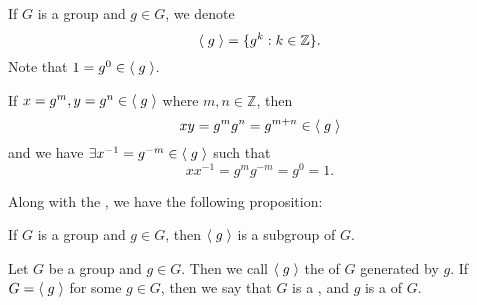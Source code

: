 \begin{notation}
  If $G$ is a group and $g \in G$, we denote
  \begin{equation*}
    \langle \; g \; \rangle = \{ g^k : k \in \mathbb{Z} \}.
  \end{equation*}
  Note that $1 = g^0 \in \langle \; g \; \rangle$.

  If $x = g^m, y = g^n \in \langle \; g \; \rangle$ where $m, n \in \mathbb{Z}$, then
  \begin{equation*}
    xy = g^m g^n = g^{m + n} \in \langle \; g \; \rangle
  \end{equation*}
  and we have $\exists x^{-1} = g^{-m} \in \langle \; g \; \rangle$ such that
  \begin{equation*}
    xx^{-1} = g^m g^{-m} = g^0 = 1.
  \end{equation*}
\end{notation}

Along with the , we have the following proposition:

\begin{propo}\label{propo:cyclic_group_as_a_subgroup}
  If $G$ is a group and $g \in G$, then $\langle \; g \; \rangle$ is a subgroup of $G$.
\end{propo}

\begin{defn}\label{defn:cyclic_groups}
  Let $G$ be a group and $g \in G$. Then we call $\langle \; g \; \rangle$ the  of $G$ generated by $g$. If $G = \langle \; g \; \rangle$ for some $g \in G$, then we say that $G$ is a , and $g$ is a  of $G$.
\end{defn}



